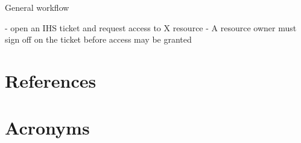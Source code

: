 \documentclass[PMO,authoryear,toc]{lsstdoc}
\begin{document}
General workflow

- open an IHS ticket and request access to X resource
- A resource owner must sign off on the ticket before access may be granted

\appendix
\section{References} \label{sec:bib}
\renewcommand{\refname}{} %


\section{Acronyms} \label{sec:acronyms}

\end{document}
